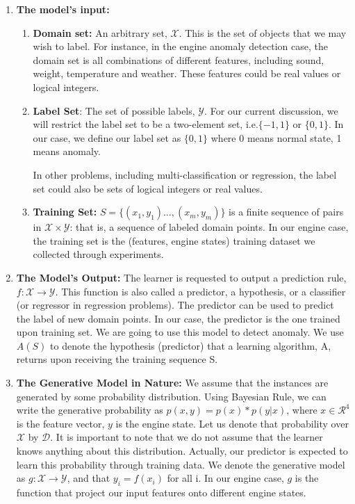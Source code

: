 \documentclass{article}[12pt]
\begin{document}
\begin{enumerate}
    \item \textbf{The model's input:}
    \begin{enumerate}
        \item \textbf{Domain set:} An arbitrary set, $\mathcal{X}$. This is the set of objects that we may wish to label. For instance, in the engine anomaly detection case, the domain set is all combinations of different features, including sound, weight, temperature and weather. These features could be real values or logical integers.
        \item \textbf{Label Set}: The set of possible labels, $\mathcal{Y}$. For our current discussion, we will restrict the label set to be a two-element set, i.e.$\{-1,1\}$ or $\{0, 1\}$. In our case, we define our label set as $\{0,1\}$ where 0 means normal state, 1 means anomaly.
        
        In other problems, including multi-classification or regression, the label set could also be sets of logical integers or real values.
        \item \textbf{Training Set:} $S=\{(x_1,y_1)\ldots,(x_m,y_m)\}$ is a finite sequence of pairs in $\mathcal{X}\times\mathcal{Y}$: that is, a sequence of labeled domain points. In our engine case, the training set is the (features, engine states) training dataset we collected through experiments.
    \end{enumerate}
    \item \textbf{The Model's Output:} The learner is requested to output a prediction rule, $f: \mathcal{X} \rightarrow \mathcal{Y}$. This function is also called a predictor, a hypothesis, or a classifier (or regressor in regression problems). The predictor can be used to predict the label of new domain points. In our case, the predictor is the one trained upon training set. We are going to use this model to detect anomaly. We use $A(S)$ to denote the hypothesis (predictor) that a learning algorithm, A, returns upon receiving the training sequence S.
    \item \textbf{The Generative Model in Nature:} We assume that the instances are generated by some probability distribution. Using Bayesian Rule, we can write the generative probability as $p(x,y)=p(x)*p(y|x)$, where $x \in \mathcal{R}^4$ is the feature vector, $y$ is the engine state. Let us denote that probability over $\mathcal{X}$ by $\mathcal{D}$. It is important to note that we do not assume that the learner knows anything about this distribution. Actually, our predictor is expected to learn this probability through training data. We denote the generative model as $g: \mathcal{X} \rightarrow \mathcal{Y}$, and that $y_i=f(x_i)$ for all i. In our engine case, $g$ is the function that project our input features onto different engine states.
    

\end{enumerate}
\end{document}
